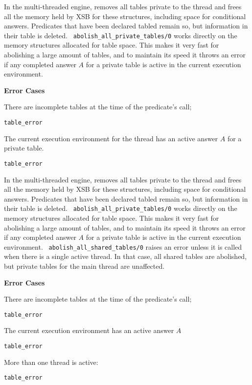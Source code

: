 \begin{description}
\begin{description}

%
In the multi-threaded engine, removes all tables private to the thread
and frees all the memory held by XSB for these structures, including
space for conditional answers.  Predicates that have been declared
tabled remain so, but information in their table is deleted.  {\tt
  abolish\_all\_private\_tables/0} works directly on the memory
structures allocated for table space.  This makes it very fast for
abolishing a large amount of tables, and to maintain its speed it
throws an error if any completed answer $A$ for a private table is
active in the current execution environment.


{\bf Error Cases}
\bi
\item There are incomplete tables at the time of the predicate's call;
\bi
\item 	{\tt table\_error}
\ei
\item The current execution environment for the thread has an active
  answer $A$ for a private table.  
\bi
\item 	{\tt table\_error}
\ei
%
\ei


%
In the multi-threaded engine, removes all tables private to the thread
and frees all the memory held by XSB for these structures, including
space for conditional answers.  Predicates that have been declared
tabled remain so, but information in their table is deleted.  {\tt
  abolish\_all\_private\_tables/0} works directly on the memory
structures allocated for table space.  This makes it very fast for
abolishing a large amount of tables, and to maintain its speed it
throws an error if any completed answer $A$ for a private table is
active in the current execution environment.  {\tt
  abolish\_all\_shared\_tables/0} raises an error unless it is called
when there is a single active thread.  In that case, all shared tables
are abolished, but private tables for the main thread are unaffected.

{\bf Error Cases}
\bi
\item There are incomplete tables at the time of the predicate's call;
\bi
\item 	{\tt table\_error}
\ei
\item The current execution environment has an active answer $A$
\bi
\item 	{\tt table\_error}
\ei
\item More than one thread is active:
\bi
\item 	{\tt table\_error}
\ei
%
%
\ei


\end{description}
\end{description}
